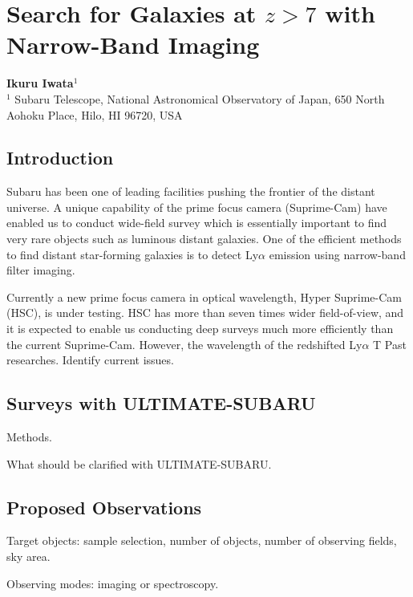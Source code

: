 \def\thisdir{science/veryhighz/}


\section{Search for Galaxies at $z>7$ with Narrow-Band Imaging
\label{sec:nbf}}

\noindent
\begin{center}
{\bf Ikuru Iwata$^{1}$}\\
$^1$ Subaru Telescope, National Astronomical Observatory of Japan, 650
North Aohoku Place, Hilo, HI 96720, USA
\end{center}
\vspace{0.5cm}

\subsection{Introduction}

Subaru has been one of leading facilities pushing the frontier of
the distant universe. A unique capability of the prime focus camera
(Suprime-Cam) have enabled us to conduct wide-field survey which is
essentially important to find very rare objects such as luminous distant
galaxies. One of the efficient methods to find distant star-forming
galaxies is to detect Ly$\alpha$ emission using narrow-band filter
imaging. 


Currently a new prime focus camera in optical wavelength,
Hyper Suprime-Cam (HSC), is under testing. HSC has more than seven times
wider field-of-view, and it is expected to enable us conducting deep
surveys much more efficiently than the current Suprime-Cam.
However, the wavelength of the redshifted Ly$\alpha$
T
Past researches.
Identify current issues.

\subsection{Surveys with ULTIMATE-SUBARU}

Methods.

What should be clarified with ULTIMATE-SUBARU.

\subsection{Proposed Observations}

Target objects: sample selection, number of objects, number of observing
fields, sky area.

Observing modes: imaging or spectroscopy.

